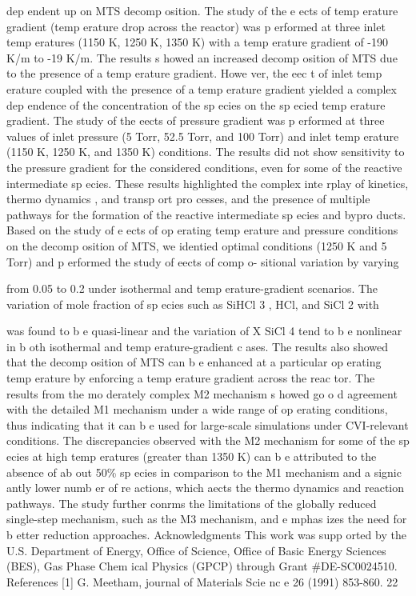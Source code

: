 \documentclass[10pt, letterpaper]{article}
\begin{document}
dep endent up on MTS decomp osition.
The study of the e ects of temp erature gradient (temp erature drop across the reactor) was p erformed at
three inlet temp eratures (1150 K, 1250 K, 1350 K) with a temp erature gradient of -190 K/m to -19 K/m.
The results s howed an increased decomp osition of MTS due to the presence of a temp erature gradient.
Howe ver, the eec t of inlet temp erature coupled with the presence of a temp erature gradient yielded a
complex dep endence of the concentration of the sp ecies on the sp ecied temp erature gradient. The study of
the eects of pressure gradient was p erformed at three values of inlet pressure (5 Torr, 52.5 Torr, and 100
Torr) and inlet temp erature (1150 K, 1250 K, and 1350 K) conditions. The results did not show sensitivity
to the pressure gradient for the considered conditions, even for some of the reactive intermediate sp ecies.
These results highlighted the complex inte rplay of kinetics, thermo dynamics , and transp ort pro cesses, and
the presence of multiple pathways for the formation of the reactive intermediate sp ecies and bypro ducts.
Based on the study of e ects of op erating temp erature and pressure conditions on the decomp osition of
MTS, we identied optimal conditions (1250 K and 5 Torr) and p erformed the study of eects of comp o-
sitional variation by varying

from 0.05 to 0.2 under isothermal and temp erature-gradient scenarios. The
variation of mole fraction of sp ecies such as SiHCl
3
, HCl, and SiCl
2
with

was found to b e quasi-linear
and the variation of
X
SiCl
4
tend to b e nonlinear in b oth isothermal and temp erature-gradient c ases. The
results also showed that the decomp osition of MTS can b e enhanced at a particular op erating temp erature
by enforcing a temp erature gradient across the reac tor.
The results from the mo derately complex M2 mechanism s howed go o d agreement with the detailed M1
mechanism under a wide range of op erating conditions, thus indicating that it can b e used for large-scale
simulations under CVI-relevant conditions. The discrepancies observed with the M2 mechanism for some
of the sp ecies at high temp eratures (greater than 1350 K) can b e attributed to the absence of ab out 50\%
sp ecies in comparison to the M1 mechanism and a signic antly lower numb er of re actions, which aects the
thermo dynamics and reaction pathways. The study further conrms the limitations of the globally reduced
single-step mechanism, such as the M3 mechanism, and e mphas izes the need for b etter reduction approaches.
Acknowledgments
This work was supp orted by the U.S. Department of Energy, Office of Science, Office of Basic Energy
Sciences (BES), Gas Phase Chem ical Physics (GPCP) through Grant \#DE-SC0024510.
References
[1]
 G. Meetham, journal of Materials Scie nc e 26 (1991) 853-860.
22
\end{document}
